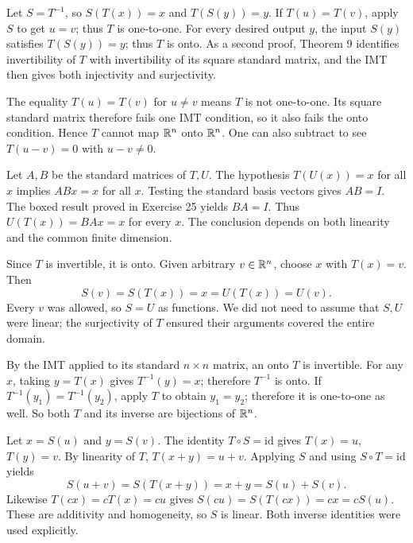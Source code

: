 Let $S=T^{-1}$, so $S(T(x))=x$ and $T(S(y))=y$.
If $T(u)=T(v)$, apply $S$ to get $u=v$; thus $T$ is one-to-one.
For every desired output $y$, the input $S(y)$ satisfies $T(S(y))=y$;
thus $T$ is onto. As a second proof, Theorem 9 identifies invertibility
of $T$ with invertibility of its square standard matrix, and the IMT
then gives both injectivity and surjectivity.

The equality $T(u)=T(v)$ for $u\ne v$ means $T$ is not one-to-one.
Its square standard matrix therefore fails one IMT condition, so it also
fails the onto condition. Hence $T$ cannot map $\mathbb{R}^n$ onto $\mathbb{R}^n$.
One can also subtract to see $T(u-v)=0$ with $u-v\ne0$.

Let $A,B$ be the standard matrices of $T,U$. The hypothesis
$T(U(x))=x$ for all $x$ implies $ABx=x$ for all $x$.
Testing the standard basis vectors gives $AB=I$.
The boxed result proved in Exercise 25 yields $BA=I$.
Thus $U(T(x))=BAx=x$ for every $x$. The conclusion depends on both
linearity and the common finite dimension.

Since $T$ is invertible, it is onto. Given arbitrary $v\in\mathbb{R}^n$,
choose $x$ with $T(x)=v$. Then
\[
 S(v)=S(T(x))=x=U(T(x))=U(v).
\]
Every $v$ was allowed, so $S=U$ as functions. We did not need to assume
that $S,U$ were linear; the surjectivity of $T$ ensured their arguments
covered the entire domain.

By the IMT applied to its standard $n\times n$ matrix, an onto $T$
is invertible. For any $x$, taking $y=T(x)$ gives $T^{-1}(y)=x$;
therefore $T^{-1}$ is onto. If $T^{-1}(y_1)=T^{-1}(y_2)$,
apply $T$ to obtain $y_1=y_2$; therefore it is one-to-one as well.
So both $T$ and its inverse are bijections of $\mathbb{R}^n$.

Let $x=S(u)$ and $y=S(v)$. The identity $T\circ S=\mathrm{id}$ gives
$T(x)=u$, $T(y)=v$. By linearity of $T$,
$T(x+y)=u+v$. Applying $S$ and using $S\circ T=\mathrm{id}$ yields
\[
 S(u+v)=S(T(x+y))=x+y=S(u)+S(v).
\]
Likewise $T(cx)=cT(x)=cu$ gives
$S(cu)=S(T(cx))=cx=cS(u)$. These are additivity and homogeneity,
so $S$ is linear. Both inverse identities were used explicitly.

